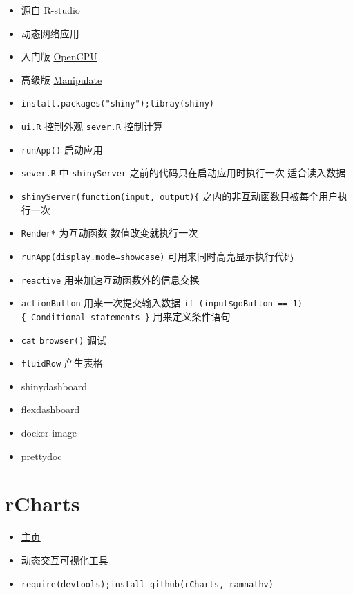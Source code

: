 \documentclass[]{book}
\providecommand{\tightlist}{%
  \setlength{\itemsep}{0pt}\setlength{\parskip}{0pt}}
\begin{document}
\begin{itemize}
\tightlist
\item
  源自 R-studio
\item
  动态网络应用
\item
  入门版 \href{https://www.opencpu.org/}{OpenCPU}
\item
  高级版 \href{https://support.rstudio.com/hc/en-us/articles/200551906-Interactive-Plotting-with-Manipulate}{Manipulate}
\item
  \texttt{install.packages("shiny");libray(shiny)}
\item
  \texttt{ui.R} 控制外观 \texttt{sever.R} 控制计算
\item
  \texttt{runApp()} 启动应用
\item
  \texttt{sever.R} 中 \texttt{shinyServer} 之前的代码只在启动应用时执行一次 适合读入数据
\item
  \texttt{shinyServer(function(input,\ output)\{} 之内的非互动函数只被每个用户执行一次
\item
  \texttt{Render*} 为互动函数 数值改变就执行一次
\item
  \texttt{runApp(display.mode=\textquotesingle{}showcase\textquotesingle{})} 可用来同时高亮显示执行代码
\item
  \texttt{reactive} 用来加速互动函数外的信息交换
\item
  \texttt{actionButton} 用来一次提交输入数据 \texttt{if\ (input\$goButton\ ==\ 1)\{\ Conditional\ statements\ \}} 用来定义条件语句
\item
  \texttt{cat} \texttt{browser()} 调试
\item
  \texttt{fluidRow} 产生表格
\item
  shinydashboard
\item
  flexdashboard
\item
  docker image
\item
  \href{https://github.com/yixuan/prettydoc}{prettydoc}
\end{itemize}

\hypertarget{rcharts}{%
\section{rCharts}\label{rcharts}}

\begin{itemize}
\tightlist
\item
  \href{http://ramnathv.github.io/rCharts/}{主页}
\item
  动态交互可视化工具
\item
  \texttt{require(devtools);install\_github(\textquotesingle{}rCharts\textquotesingle{},\ \textquotesingle{}ramnathv\textquotesingle{})}
\end{itemize}
\end{document}
